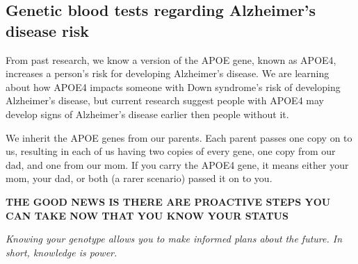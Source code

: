 \subsection{Genetic blood tests regarding Alzheimer’s disease risk}

From past research, we know a version of the APOE gene, known as APOE4, increases a person’s risk for developing Alzheimer’s disease. We are learning about how APOE4 impacts someone with Down syndrome’s risk of developing Alzheimer’s disease, but current research suggest people with APOE4 may develop signs of Alzheimer’s disease earlier then people without it.

We inherit the APOE genes from our parents. Each parent passes one copy on to us, resulting in each of us having two copies of every gene, one copy from our dad, and one from our mom. If you carry the APOE4 gene, it means either your mom, your dad, or both (a rarer scenario) passed it on to you. 

\textbf{THE GOOD NEWS IS THERE ARE PROACTIVE STEPS YOU CAN TAKE NOW THAT YOU KNOW YOUR STATUS}

\textit{Knowing your genotype allows you to make informed plans about the future. In short, knowledge is power.}